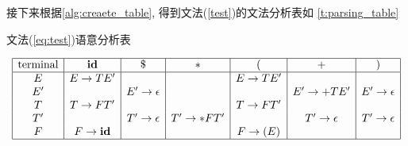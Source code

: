 \documentclass[../report]{subfiles}
\begin{document}
接下来根据\cref{alg:creaete_table},
得到文法(\ref{test})的文法分析表如%
\cref{t:parsing_table}

\begin{table}[H]
  \caption{文法(\ref{eq:test})语意分析表}
  \label{t:parsing_table}
  \[
    \begin{array}{|c|c|c|c|c|c|c|}
      \hline
      \text{terminal}	&\textbf{id}	&\$	&*	&(	&+	&)\\ \hline
        E 	&	E \to T E' 	& 	& 	&	E \to T E' 	& 	&\\
        E' 	& 	&	E' \to \epsilon 	& 	& 	&	E' \to + T E' 	&	E' \to \epsilon\\
        T 	&	T \to F T' 	& 	& 	&	T \to F T' 	& 	&\\ 
        T' 	& 	&	T' \to \epsilon 	&	T' \to * F T' 	& 	&	T' \to \epsilon 	&	T' \to \epsilon\\
        F 	&	F \to \textbf{id} 	& 	& 	&	F \to ( E ) 	& 	&\\
      \hline
    \end{array}
  \]
\end{table}
\end{document}
